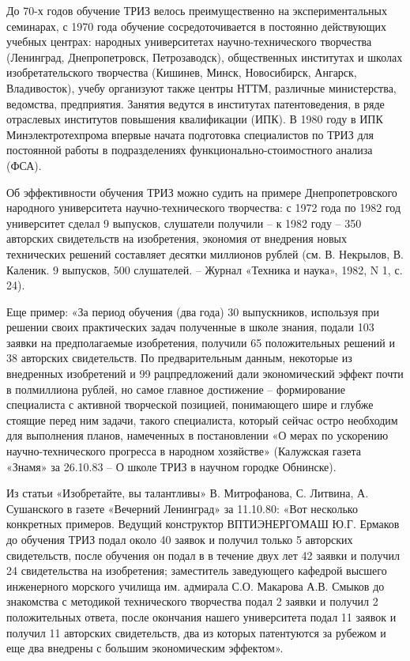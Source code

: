 \documentclass[11pt,a4paper]{article}
\begin{document}
До 70-х годов обучение ТРИЗ велось преимущественно на экспериментальных
семинарах, с 1970 года обучение сосредоточивается в постоянно действующих
учебных центрах: народных университетах научно-технического творчества
(Ленинград, Днепропетровск, Петрозаводск), общественных институтах и школах
изобретательского творчества (Кишинев, Минск, Новосибирск, Ангарск,
Владивосток), учебу организуют также центры НТТМ, различные министерства,
ведомства, предприятия. Занятия ведутся в институтах патентоведения, в ряде
отраслевых институтов повышения квалификации (ИПК). В 1980 году в ИПК
Минэлектротехпрома впервые начата подготовка специалистов по ТРИЗ для
постоянной работы в подразделениях функционально-стоимостного анализа (ФСА).

Об эффективности обучения ТРИЗ можно судить на примере Днепропетровского
народного университета научно-технического творчества: с 1972 года по 1982 год
университет сделал 9 выпусков, слушатели получили -- к 1982 году -- 350
авторских свидетельств на изобретения, экономия от внедрения новых технических
решений составляет десятки миллионов рублей (см. В. Некрылов, В. Каленик. 9
выпусков, 500 слушателей. -- Журнал «Техника и наука», 1982, N 1, с. 24).

Еще пример: «За период обучения (два года) 30 выпускников, используя при
решении своих практических задач полученные в школе знания, подали 103 заявки
на предполагаемые изобретения, получили 65 положительных решений и 38
авторских свидетельств. По предварительным данным, некоторые из внедренных
изобретений и 99 рацпредложений дали экономический эффект почти в полмиллиона
рублей, но самое главное достижение -- формирование специалиста с активной
творческой позицией, понимающего шире и глубже стоящие перед ним задачи,
такого специалиста, который сейчас остро необходим для выполнения планов,
намеченных в постановлении «О мерах по ускорению научно-технического прогресса
в народном хозяйстве» (Калужская газета «Знамя» за 26.10.83 -- О школе ТРИЗ в
научном городке Обнинске).

Из статьи «Изобретайте, вы талантливы» В. Митрофанова, С. Литвина,
А. Сушанского в газете «Вечерний Ленинград» за 11.10.80: «Вот несколько
конкретных примеров. Ведущий конструктор ВПТИЭНЕРГОМАШ Ю.Г. Ермаков до
обучения ТРИЗ подал около 40 заявок и получил только 5 авторских свидетельств,
после обучения он подал в в течение двух лет 42 заявки и получил 24
свидетельства на изобретения; заместитель заведующего кафедрой высшего
инженерного морского училища им. адмирала С.О. Макарова А.В. Смыков до
знакомства с методикой технического творчества подал 2 заявки и получил 2
положительных ответа, после окончания нашего университета подал 11 заявок и
получил 11 авторских свидетельств, два из которых патентуются за рубежом и еще
два внедрены с большим экономическим эффектом».
\end{document}

